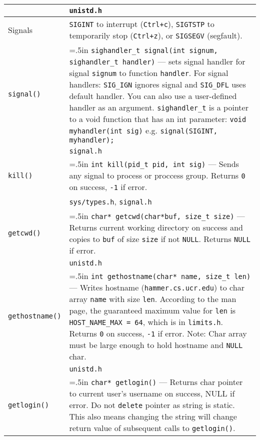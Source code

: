\documentclass{article}
\newcommand{\indenth}[1][.5]{\hangindent=#1in
                         \hangafter=1 }
\begin{document}
\begin{longtabu}{p{1in}|p{5.7in}}
        \\
    & \texttt{unistd.h}
        \\ \hline
    Signals & \texttt{SIGINT} to interrupt (\texttt{Ctrl+c}), \texttt{SIGTSTP} to temporarily stop (\texttt{Ctrl+z}), or \texttt{SIGSEGV} (segfault). \par
        \\
    \texttt{signal()} & \indenth\texttt{sighandler\_t signal(int signum, sighandler\_t handler)} --- sets signal handler for signal \texttt{signum} to function \texttt{handler}.  For signal handlers: \texttt{SIG\_IGN} ignores signal and \texttt{SIG\_DFL} uses default handler. You can also use a user-defined handler as an argument. \texttt{sighandler\_t} is a pointer to a void function that has an int parameter: \texttt{void myhandler(int sig)}
    \newline e.g. \texttt{signal(SIGINT, myhandler);}
        \\
    & \texttt{signal.h}
        \\
    \texttt{kill()} & \indenth\texttt{int kill(pid\_t pid, int sig)} --- Sends any signal to process or proccess group. Returns \texttt{0} on success, \texttt{-1} if error.
        \\
    & \texttt{sys/types.h}, \texttt{signal.h}
        \\ \hline
    \texttt{getcwd()} & \indenth\texttt{char* getcwd(char*buf, size\_t size)} --- Returns current working directory on success and copies to \texttt{buf} of size \texttt{size} if not \texttt{NULL}.  Returns \texttt{NULL} if error.
        \\
    & \texttt{unistd.h}
        \\
    \texttt{gethostname()} & \indenth\texttt{int gethostname(char* name, size\_t len)} --- Writes hostname (\texttt{hammer.cs.ucr.edu}) to char array \texttt{name} with size \texttt{len}.  According to the man page, the guaranteed maximum value for \texttt{len} is \texttt{HOST\_NAME\_MAX = 64}, which is in \texttt{limits.h}. Returns \texttt{0} on success, \texttt{-1} if error. Note: Char array must be large enough to hold hostname and \texttt{NULL} char.
        \\
    & \texttt{unistd.h}
        \\ 
    \texttt{getlogin()} & \indenth\texttt{char* getlogin()} --- Returns char pointer to current user's username on success, NULL if error. Do not \texttt{delete} pointer as string is static. This also means changing the string will change return value of subsequent calls to \texttt{getlogin()}.

\end{longtabu}
\end{document}
